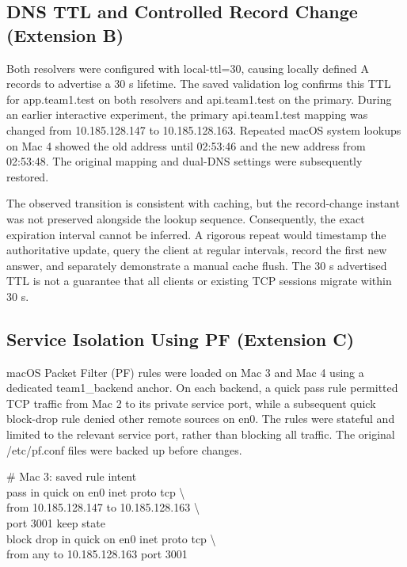 \documentclass[conference]{IEEEtran}
\begin{document}
\subsection{DNS TTL and Controlled Record Change (Extension
B)}\label{b.-dns-ttl-and-controlled-record-change-extension-b}

Both resolvers were configured with local-ttl=30, causing locally
defined A records to advertise a 30 s lifetime. The saved validation log
confirms this TTL for app.team1.test on both resolvers and
api.team1.test on the primary. During an earlier interactive experiment,
the primary api.team1.test mapping was changed from 10.185.128.147 to
10.185.128.163. Repeated macOS system lookups on Mac 4 showed the old
address until 02:53:46 and the new address from 02:53:48. The original
mapping and dual-DNS settings were subsequently restored.

The observed transition is consistent with caching, but the
record-change instant was not preserved alongside the lookup sequence.
Consequently, the exact expiration interval cannot be inferred. A
rigorous repeat would timestamp the authoritative update, query the
client at regular intervals, record the first new answer, and separately
demonstrate a manual cache flush. The 30 s advertised TTL is not a
guarantee that all clients or existing TCP sessions migrate within 30 s.

\subsection{Service Isolation Using PF (Extension
C)}\label{c.-service-isolation-using-pf-extension-c}

macOS Packet Filter (PF) rules were loaded on Mac 3 and Mac 4 using a
dedicated team1\_backend anchor. On each backend, a quick pass rule
permitted TCP traffic from Mac 2 to its private service port, while a
subsequent quick block-drop rule denied other remote sources on en0. The
rules were stateful and limited to the relevant service port, rather
than blocking all traffic. The original /etc/pf.conf files were backed
up before changes.

\# Mac 3: saved rule intent\\
pass in quick on en0 inet proto tcp \textbackslash{}\\
from 10.185.128.147 to 10.185.128.163 \textbackslash{}\\
port 3001 keep state\\
block drop in quick on en0 inet proto tcp \textbackslash{}\\
from any to 10.185.128.163 port 3001
\end{document}
